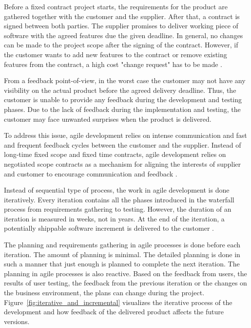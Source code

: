 \documentclass[english,12pt,a4paper,pdftex]{article}
\begin{document}
Before a fixed contract project starts, the requirements for the product are gathered together with the customer and the supplier. After that, a contract is signed between both parties. The supplier promises to deliver working piece of software with the agreed features due the given deadline. In general, no changes can be made to the project scope after the signing of the contract. However, if the customer wants to add new features to the contract or remove existing features from the contract, a high cost "change request" has to be made \citep{beck2004}. 

From a feedback point-of-view, in the worst case the customer may not have any visibility on the actual product before the agreed delivery deadline. Thus, the customer is unable to provide any feedback during the development and testing phases. Due to the lack of feedback during the implementation and testing, the customer may face unwanted surprises when the product is delivered.

To address this issue, agile development relies on intense communication and fast and frequent feedback cycles between the customer and the supplier. Instead of long-time fixed scope and fixed time contracts, agile development relies on negotiated scope contracts as a mechanism for aligning the interests of supplier and customer to encourage communication and feedback \citep{beck2004}.

Instead of sequential type of process, the work in agile development is done iteratively. Every iteration contains all the phases introduced in the waterfall process from requirements gathering to testing. However, the duration of an iteration is measured in weeks, not in years. At the end of the iteration, a potentially shippable software increment is delivered to the customer \citep{shore2007}.

The planning and requirements gathering in agile processes is done before each iteration. The amount of planning is minimal. The detailed planning is done in such a manner that just enough is planned to complete the next iteration. The planning in agile processes is also reactive. Based on the feedback from users, the results of user testing, the feedback from the previous iteration or the changes on the business environment, the plans can change during the project. Figure~\ref{fig:iterative_and_incremental} visualizes the iterative process of the development and how feedback of the delivered product affects the future versions.
\end{document}
